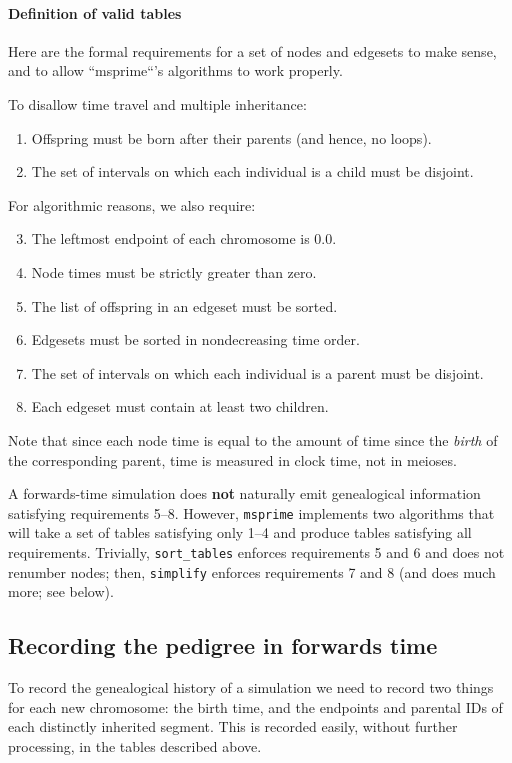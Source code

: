 \documentclass{article}
\newcommand{\msprime}{\texttt{msprime}}
\begin{document}
\paragraph{Definition of valid tables}
Here are the formal requirements for a set of nodes and edgesets to make sense,
and to allow ``msprime``'s algorithms to work properly.

To disallow time travel and multiple inheritance:
\begin{enumerate}
    \item Offspring must be born after their parents (and hence, no loops).
    \item The set of intervals on which each individual is a child must be disjoint.
\end{enumerate}
For algorithmic reasons, we also require:
\begin{enumerate} \setcounter{enumi}{2}
    \item The leftmost endpoint of each chromosome is 0.0.
    \item Node times must be strictly greater than zero.
    \item The list of offspring in an edgeset must be sorted.
    \item Edgesets must be sorted in nondecreasing time order.
    \item The set of intervals on which each individual is a parent must be disjoint.
    \item Each edgeset must contain at least two children.
\end{enumerate}
Note that since each node time is equal to the amount of time since the \emph{birth} of the
corresponding parent, time is measured in clock time, not in meioses.

A forwards-time simulation does \textbf{not} naturally emit genealogical information
satisfying requirements 5--8.
However, \msprime{} implements two algorithms that will take a set of tables
satisfying only 1--4 and produce tables satisfying all requirements.
Trivially, \texttt{sort\_tables} enforces requirements 5 and 6 and does not renumber nodes;
then, \texttt{simplify} enforces requirements 7 and 8 (and does much more; see below).


\subsection*{Recording the pedigree in forwards time}

To record the genealogical history of a simulation
we need to record two things for each new chromosome:
the birth time,
and the endpoints and parental IDs of each distinctly inherited segment.
This is recorded easily, without further processing,
in the tables described above.
\end{document}
